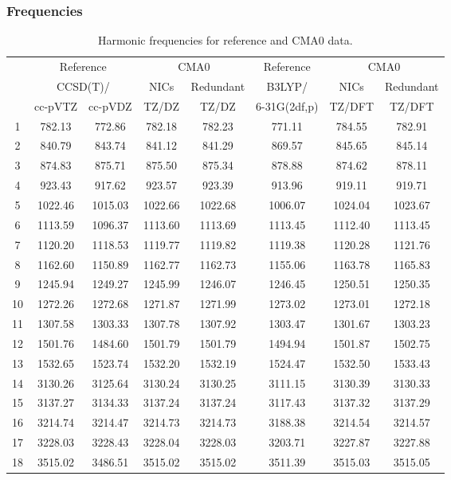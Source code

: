 \documentclass[10pt,oneside]{article}
\begin{document}
\begin{table}[h!]
\subsubsection*{Frequencies}
\centering
\caption{Harmonic frequencies for reference and CMA0 data.}
\begin{tabular}{cccccccc}
\toprule
{} & \multicolumn{2}{c}{Reference} & \multicolumn{2}{c}{CMA0} &    Reference & \multicolumn{2}{c}{CMA0} \\
{} & \multicolumn{2}{c}{CCSD(T)/} &    NICs &  Redundant &       B3LYP/ &    NICs & Redundant \\
{} &   cc-pVTZ & cc-pVDZ &   TZ/DZ &      TZ/DZ & 6-31G(2df,p) &  TZ/DFT &    TZ/DFT \\
\midrule
1  &    782.13 &  772.86 &  782.18 &     782.23 &       771.11 &  784.55 &    782.91 \\
2  &    840.79 &  843.74 &  841.12 &     841.29 &       869.57 &  845.65 &    845.14 \\
3  &    874.83 &  875.71 &  875.50 &     875.34 &       878.88 &  874.62 &    878.11 \\
4  &    923.43 &  917.62 &  923.57 &     923.39 &       913.96 &  919.11 &    919.71 \\
5  &   1022.46 & 1015.03 & 1022.66 &    1022.68 &      1006.07 & 1024.04 &   1023.67 \\
6  &   1113.59 & 1096.37 & 1113.60 &    1113.69 &      1113.45 & 1112.40 &   1113.45 \\
7  &   1120.20 & 1118.53 & 1119.77 &    1119.82 &      1119.38 & 1120.28 &   1121.76 \\
8  &   1162.60 & 1150.89 & 1162.77 &    1162.73 &      1155.06 & 1163.78 &   1165.83 \\
9  &   1245.94 & 1249.27 & 1245.99 &    1246.07 &      1246.45 & 1250.51 &   1250.35 \\
10 &   1272.26 & 1272.68 & 1271.87 &    1271.99 &      1273.02 & 1273.01 &   1272.18 \\
11 &   1307.58 & 1303.33 & 1307.78 &    1307.92 &      1303.47 & 1301.67 &   1303.23 \\
12 &   1501.76 & 1484.60 & 1501.79 &    1501.79 &      1494.94 & 1501.87 &   1502.75 \\
13 &   1532.65 & 1523.74 & 1532.20 &    1532.19 &      1524.47 & 1532.50 &   1533.43 \\
14 &   3130.26 & 3125.64 & 3130.24 &    3130.25 &      3111.15 & 3130.39 &   3130.33 \\
15 &   3137.27 & 3134.33 & 3137.24 &    3137.24 &      3117.43 & 3137.32 &   3137.29 \\
16 &   3214.74 & 3214.47 & 3214.73 &    3214.73 &      3188.38 & 3214.54 &   3214.57 \\
17 &   3228.03 & 3228.43 & 3228.04 &    3228.03 &      3203.71 & 3227.87 &   3227.88 \\
18 &   3515.02 & 3486.51 & 3515.02 &    3515.02 &      3511.39 & 3515.03 &   3515.05 \\
\bottomrule
\end{tabular}
\end{table}
\end{document}
